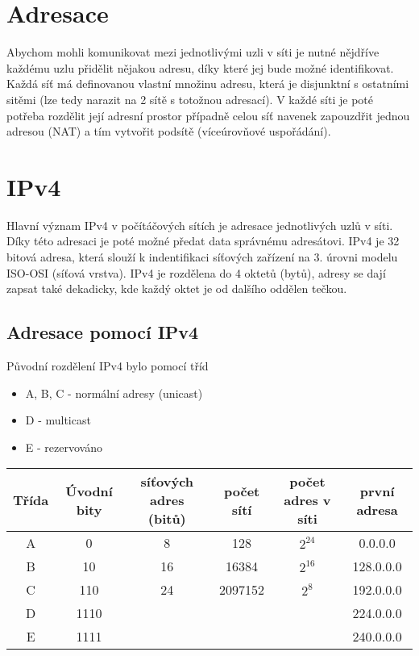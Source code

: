 \documentclass{szzclass}
\author{Tomáš Starý}
\begin{document}
\tableofcontents

\newpage

\section{Adresace}

Abychom mohli komunikovat mezi jednotlivými uzli v síti je nutné nějdříve každému uzlu přidělit nějakou adresu, díky které jej bude možné identifikovat.
Každá síť má definovanou vlastní množinu adresu, která je disjunktní s ostatními sitěmi (lze tedy narazit na 2 sítě s totožnou adresací). V každé síti
je poté potřeba rozdělit její adresní prostor případně celou síť navenek zapouzdřit jednou adresou (NAT) a tím vytvořit podsítě (víceúrovňové uspořádání).

\section{IPv4}

Hlavní význam IPv4 v počítáčových sítích je adresace jednotlivých uzlů v síti. Díky této adresaci je poté možné
předat data správnému adresátovi. IPv4 je 32 bitová adresa, která slouží k indentifikaci síťových zařízení na 3. úrovni modelu
ISO-OSI (síťová vrstva). IPv4 je rozdělena do 4 oktetů (bytů), adresy se dají zapsat také dekadicky, kde každý oktet je od dalšího oddělen tečkou.

\subsection{Adresace pomocí IPv4}

Původní rozdělení IPv4 bylo pomocí tříd
\begin{itemize}
    \item A, B, C - normální adresy (unicast)
    \item D - multicast
    \item E - rezervováno
\end{itemize}

\begin{tabular}{c|c|c|c|c|c}
    Třída & Úvodní bity & síťových adres (bitů) & počet sítí & počet adres v síti & první adresa \\
    \hline
    A & 0 & 8 & 128 & $2^24$ & 0.0.0.0 \\
    B & 10 & 16 & 16384 & $2^16$ & 128.0.0.0 \\
    C & 110 & 24 & 2097152 & $2^8$ & 192.0.0.0 \\
    D & 1110 & & & & 224.0.0.0 \\
    E & 1111 & & & &  240.0.0.0 \\
\end{tabular}
\end{document}
